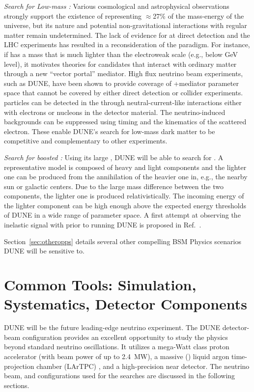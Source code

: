 \textit{Search for Low-mass :} Various cosmological and astrophysical observations strongly support the existence of  representing $\approx$27\% of the mass-energy of the universe, but its nature and potential non-gravitational interactions with regular matter remain undetermined. The lack of evidence for  at direct detection and the LHC experiments has resulted in a reconsideration of the  paradigm. For instance, if  has a mass that is much lighter than the electroweak scale (e.g., below GeV level), it motivates theories for  candidates that interact with ordinary matter through a new ``vector portal'' mediator. High flux neutrino beam experiments, such as DUNE, have been shown to provide coverage of +mediator parameter space that cannot be covered by either direct detection or collider experiments.  particles can be detected in the   through neutral-current-like interactions either with electrons or nucleons in the detector material. The neutrino-induced backgrounds can be suppressed using timing and the kinematics of the scattered electron. These enable DUNE's search for low-mass dark matter to be competitive and complementary to other experiments.

\textit{Search for boosted :} Using its large , DUNE will be able to search for . A representative model is composed of heavy and light  components and the lighter one can be produced from the annihilation of the heavier one in, e.g., the nearby sun or galactic centers. Due to the large mass difference between the two   components, the lighter one is produced relativistically. The incoming energy of the lighter  component can be high enough above the expected energy thresholds of DUNE in a wide range of parameter space. A first attempt at observing the inelastic  signal with  prior to running DUNE is proposed in Ref.~\cite{Chatterjee:2018mej}.

Section~\ref{sec:otheropps} details several other compelling BSM Physics scenarios DUNE will be sensitive to.

\section{Common Tools: Simulation, Systematics, Detector Components}
\label{sec:tools}

DUNE will be the future leading-edge neutrino experiment. The DUNE detector-beam configuration provides an excellent opportunity to study the physics beyond standard neutrino
oscillations. It utilizes a mega-Watt class proton accelerator (with beam power of up to \SI{2.4}{MW}), a massive (\fdfiducialmass) liquid argon time-projection chamber (LArTPC) , and a high-precision near detector. The neutrino beam,  and  configurations used for the  searches are discussed in the following sections.

